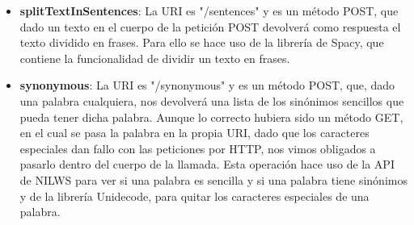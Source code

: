 \begin{itemize}
	\item \textbf{splitTextInSentences}: La URI es "/sentences" y es un método POST, que dado un texto en el cuerpo de la petición POST devolverá como respuesta el texto dividido en frases.
	Para ello se hace uso de la librería de Spacy, que contiene la funcionalidad de dividir un texto en frases.
	
	\item \textbf{synonymous}: La URI es "/synonymous" y es un método POST, que, dado una palabra cualquiera, nos devolverá una lista de los sinónimos sencillos que pueda tener dicha palabra.
	Aunque lo correcto hubiera sido un método GET, en el cual se pasa la palabra en la propia URI,
	dado que los caracteres especiales dan fallo con las peticiones por HTTP, nos vimos obligados a pasarlo dentro del cuerpo de la llamada.
	Esta operación hace uso de la API de NILWS para ver si una palabra es sencilla y si una palabra tiene sinónimos y de la librería Unidecode, para quitar los
	caracteres especiales de una palabra.
\end{itemize}

